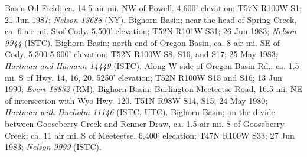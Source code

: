 Basin Oil Field; ca. 14.5 air mi. NW of Powell. 4,600' elevation;
T57N R100W S1; 21 Jun 1987; \textit{Nelson	13688} (NY).
Bighorn Basin; near the head of Spring Creek, ca. 6 air mi. S of Cody.
5,500' elevation; T52N R101W S31; 26 Jun 1983; \textit{Nelson 9944} (ISTC).
Bighorn Basin; north end of Oregon Basin, ca. 8 air mi. SE of Cody.
5,300-5,600' elevation; T52N R100W S8, S16, and S17; 25 May 1983;
\textit{Hartman and Hamann 14449} (ISTC).
Along W side of Oregon Basin Rd., ca. 1.5 mi. S of Hwy. 14, 16, 20.
5250' elevation; T52N R100W S15 and S16;	13 Jun 1990;
\textit{Evert 18832} (RM).
Bighorn Basin; Burlington Meeteetse Road, 16.5 mi. NE of intersection with
Wyo Hwy. 120. T51N R98W S14, S15; 24 May 1980;
\textit{Hartman with Dueholm 11146} (ISTC, UTC).
Bighorn Basin; on the divide between Gooseberry Creek and Renner Draw, ca.
1.5 air mi. S of Gooseberry Creek; ca. 11 air mi. S of Meeteetse.
6,400' elecation; T47N R100W S33; 27 Jun 1983; \textit{Nelson 9999} (ISTC).

